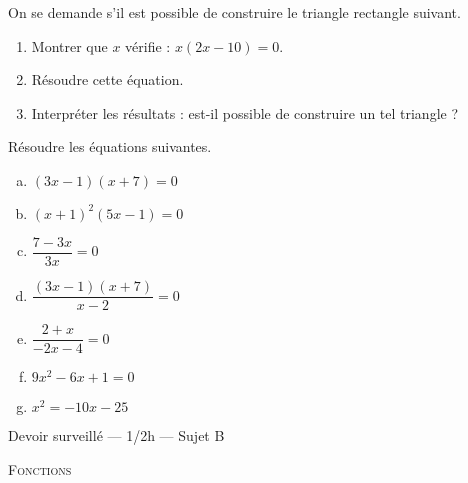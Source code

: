 \documentclass[11pt]{article}
\begin{document}
  \begin{exercice} On se demande s'il est possible de construire le triangle rectangle suivant.

    \begin{center}
    \end{center}
    \begin{enumerate}
      \item Montrer que $x$ vérifie : $x(2x-10)=0$.
      \item Résoudre cette équation.
      \item Interpréter les résultats : est-il possible de construire un tel triangle ?
    \end{enumerate}
  \end{exercice}

  \begin{exercice}
    Résoudre les équations suivantes.

    \begin{multicols}{2}
    \begin{enumerate}[(a)]
      \item $(3x-1)(x+7)=0$
      \item $(x+1)^2(5x-1)=0$
      \item $\dfrac{7-3x}{3x}=0$
      \item $\dfrac{(3x-1)(x+7)}{x-2}=0$
      \item $\dfrac{2+x}{-2x-4}=0$
      \item $9x^2-6x+1=0$
      \item $x^2=-10x-25$
    \end{enumerate}
  \end{multicols}
  \end{exercice}

  \pagebreak
  \setcounter{exercice}{0}

  \begin{center}
    {\large
      Devoir surveillé --- 1/2h --- Sujet B

      \textsc{Fonctions}
    }
  \end{center}
\end{document}
